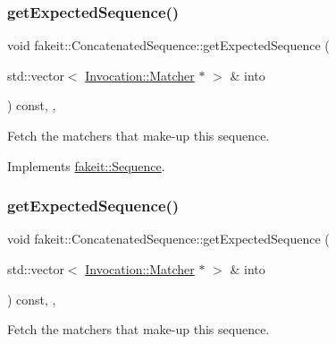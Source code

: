 \subsubsection{\texorpdfstring{getExpectedSequence()}{getExpectedSequence()}\hspace{0.1cm}{\footnotesize\ttfamily [1/9]}}
{\footnotesize\ttfamily void fakeit\+::\+Concatenated\+Sequence\+::get\+Expected\+Sequence (\begin{DoxyParamCaption}\item[{std\+::vector$<$ \mbox{\hyperlink{structfakeit_1_1Invocation_1_1Matcher}{Invocation\+::\+Matcher}} $\ast$ $>$ \&}]{into }\end{DoxyParamCaption}) const\hspace{0.3cm}{\ttfamily [inline]}, {\ttfamily [override]}, {\ttfamily [virtual]}}



Fetch the matchers that make-\/up this sequence. 



Implements \mbox{\hyperlink{classfakeit_1_1Sequence_aa1a1e4ad2fcac3379ba38f250bf06884}{fakeit\+::\+Sequence}}.

\mbox{\label{classfakeit_1_1ConcatenatedSequence_a176b1d4dac2e552f646c2c3ce98f0d1f}} 
\subsubsection{\texorpdfstring{getExpectedSequence()}{getExpectedSequence()}\hspace{0.1cm}{\footnotesize\ttfamily [2/9]}}
{\footnotesize\ttfamily void fakeit\+::\+Concatenated\+Sequence\+::get\+Expected\+Sequence (\begin{DoxyParamCaption}\item[{std\+::vector$<$ \mbox{\hyperlink{structfakeit_1_1Invocation_1_1Matcher}{Invocation\+::\+Matcher}} $\ast$ $>$ \&}]{into }\end{DoxyParamCaption}) const\hspace{0.3cm}{\ttfamily [inline]}, {\ttfamily [override]}, {\ttfamily [virtual]}}



Fetch the matchers that make-\/up this sequence. 



